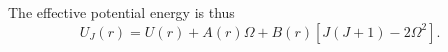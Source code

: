 The effective potential energy is thus
\begin{equation}U_J(r)=U(r)+A(r)\Omega+B(r)[J(J+1)-2\Omega^2].\tag{83.6}\end{equation}
